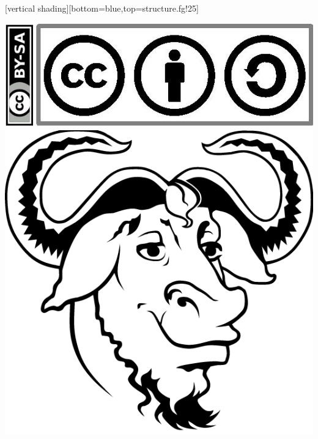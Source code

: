 \documentclass{beamer}
\begin{document}
\begin{frame}
\frametitle{}

[vertical shading][bottom=blue,top=structure.fg!25]


\begin{center} \includegraphics[scale=.3]{../images/CC_BY_SA.jpg} \hspace{.5cm} \includegraphics[scale=.15]{../images/GNU.png}

\end{center}




\end{frame}
% 
% 
\end{document}
